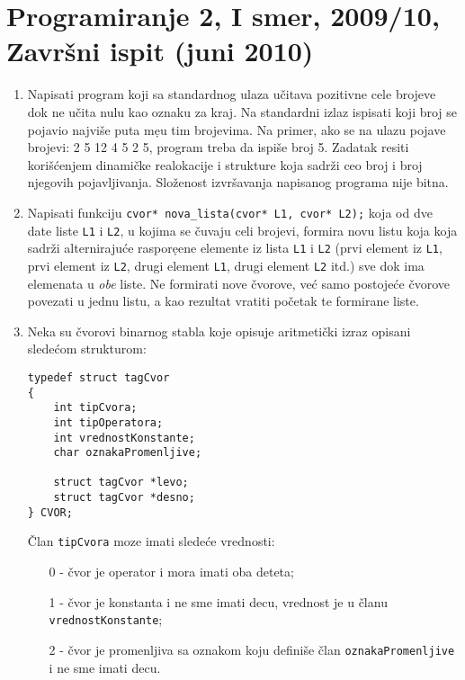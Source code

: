 

\section{Programiranje 2, I smer, 2009/10, Zavr\v sni ispit (juni 2010)}


\begin{enumerate}
\item Napisati program koji sa standardnog ulaza u\v{c}itava pozitivne cele
brojeve dok ne u\v{c}ita nulu kao oznaku za kraj. Na standardni izlaz ispisati
koji broj se pojavio najvi\v{s}e puta me{\d}u tim brojevima. Na primer, ako se
na ulazu pojave brojevi: 2 5 12 4 5 2 5, program treba da ispi\v{s}e broj 5.
Zadatak resiti kori\v{s}\'cenjem dinami\v{c}ke realokacije i strukture koja
sadr\v{z}i ceo broj i broj njegovih pojavljivanja. Slo\v{z}enost izvr\v{s}avanja
napisanog programa nije bitna.

\item Napisati funkciju \verb|cvor* nova_lista(cvor* L1, cvor* L2);|
koja od dve date liste \verb|L1| i \verb|L2|, u kojima se \v{c}uvaju celi brojevi, formira
novu listu koja koja sadr\v{z}i alterniraju\'ce raspore{\d}ene elemente iz lista \verb|L1| i
\verb|L2| (prvi element iz \verb|L1|, prvi element iz \verb|L2|, drugi element \verb|L1|,
drugi element \verb|L2| itd.) sve dok ima elemenata u {\em obe} liste. Ne formirati nove
\v{c}vorove, ve\'c samo postoje\'ce \v{c}vorove povezati u jednu listu, a kao rezultat
vratiti po\v{c}etak te formirane liste.

\item Neka su \v{c}vorovi binarnog stabla koje opisuje aritmeti\v{c}ki izraz opisani
slede\'com strukturom:

\begin{verbatim}
typedef struct tagCvor
{
    int tipCvora;
    int tipOperatora;
    int vrednostKonstante;
    char oznakaPromenljive;

    struct tagCvor *levo;
    struct tagCvor *desno;
} CVOR;
\end{verbatim}

\v{C}lan \verb|tipCvora| moze imati slede\'ce vrednosti:
\begin{itemize}
\item[0] - \v{c}vor je operator i mora imati oba deteta;
\item[1] - \v{c}vor je konstanta i ne sme imati decu, vrednost je u \v clanu \verb|vrednostKonstante|;
\item[2] - \v{c}vor je promenljiva sa oznakom koju defini\v{s}e \v{c}lan \verb|oznakaPromenljive|
i ne sme imati decu.
\end{itemize}


\end{enumerate}
